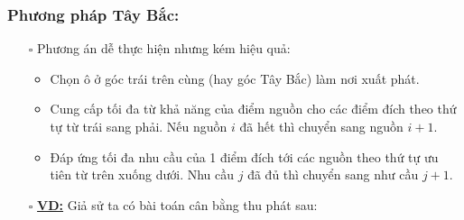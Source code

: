 \documentclass{article}
\begin{document}
\subsubsection{Phương pháp Tây Bắc:}
\begin{itemize}
    \item [$\square$] Phương án dễ thực hiện nhưng kém hiệu quả:
    \begin{itemize}[label=\textbullet]
        \item Chọn ô ở góc trái trên cùng (hay góc Tây Bắc) làm nơi xuất phát.
        \item Cung cấp tối đa từ khả năng của điểm nguồn cho các điểm đích theo thứ tự từ trái sang phải. Nếu nguồn $i$ đã hết thì chuyển sang nguồn $i+1$.
        \item Đáp ứng tối đa nhu cầu của 1 điểm đích tới các nguồn theo thứ tự ưu tiên từ trên xuống dưới. Nhu cầu $j$ đã đủ thì chuyển sang như cầu $j+1$.
    \end{itemize}
    \item [$\square$] \textbf{\underline{VD:}} Giả sử ta có bài toán cân bằng thu phát sau:
\end{itemize}
\end{document}

